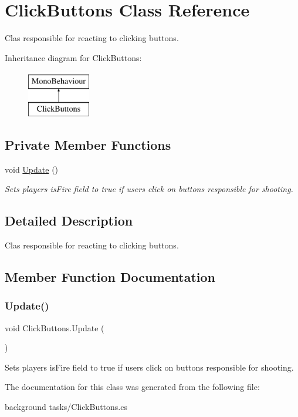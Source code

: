 \hypertarget{class_click_buttons}{}\section{Click\+Buttons Class Reference}
\label{class_click_buttons}


Clas responsible for reacting to clicking buttons.  


Inheritance diagram for Click\+Buttons\+:\begin{figure}[H]
\begin{center}
\leavevmode
\includegraphics[height=2.000000cm]{class_click_buttons}
\end{center}
\end{figure}
\subsection*{Private Member Functions}
\begin{DoxyCompactItemize}
\item 
void \mbox{\hyperlink{class_click_buttons_ab89515d46c85b226d896173dff5a7141}{Update}} ()
\begin{DoxyCompactList}\small\item\em Sets players\textquotesingle{} is\+Fire field to true if users click on buttons responsible for shooting. \end{DoxyCompactList}\end{DoxyCompactItemize}


\subsection{Detailed Description}
Clas responsible for reacting to clicking buttons. 



\subsection{Member Function Documentation}
\mbox{\label{class_click_buttons_ab89515d46c85b226d896173dff5a7141}} 
\subsubsection{\texorpdfstring{Update()}{Update()}}
{\footnotesize\ttfamily void Click\+Buttons.\+Update (\begin{DoxyParamCaption}{ }\end{DoxyParamCaption})\hspace{0.3cm}{\ttfamily [private]}}



Sets players\textquotesingle{} is\+Fire field to true if users click on buttons responsible for shooting. 



The documentation for this class was generated from the following file\+:\begin{DoxyCompactItemize}
\item 
background tasks/Click\+Buttons.\+cs\end{DoxyCompactItemize}
